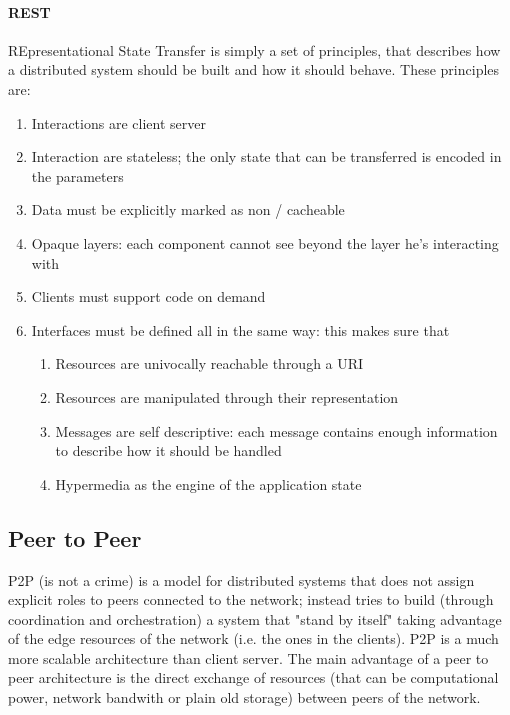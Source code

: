 \documentclass[10pt,a4paper]{article}
\begin{document}
					\paragraph{REST}
						REpresentational State Transfer is simply a set of principles, that describes how a distributed system should be built and how it should behave. These principles are:
						\begin{enumerate}
							\item Interactions are client server
							\item Interaction are stateless; the only state that can be transferred is encoded in the parameters
							\item Data must be explicitly marked as non / cacheable
							\item Opaque layers: each component cannot see beyond the layer he's interacting with
							\item Clients must support code on demand
							\item Interfaces must be defined all in the same way: this makes sure that
								\begin{enumerate}
									\item Resources are univocally reachable through a URI
									\item Resources are manipulated through their representation
									\item Messages are self descriptive: each message contains enough information to describe how it should be handled
									\item Hypermedia as the engine of the application state
								\end{enumerate}
						\end{enumerate}
			
			\subsection{Peer to Peer}
				P2P (is not a crime) is a model for distributed systems that does not assign explicit roles to peers connected to the network; instead tries to build (through coordination and orchestration) a system that "stand by itself" taking advantage of the edge resources of the network (i.e. the ones in the clients). P2P is a much more scalable architecture than client server. The main advantage of a peer to peer architecture is the direct exchange of resources (that can be computational power, network bandwith or plain old storage) between peers of the network.
\end{document}
